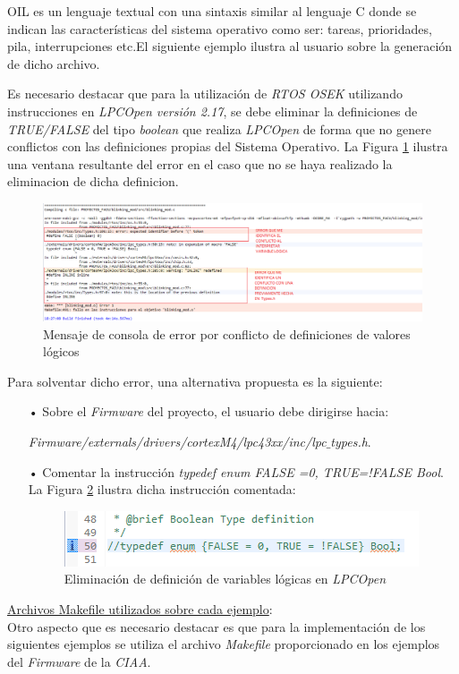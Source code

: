 \documentclass[12pt,letterpaper]{article}
\begin{document}
OIL es un lenguaje textual con una sintaxis similar al lenguaje C donde se indican las características del sistema operativo como ser: tareas, prioridades, pila, interrupciones etc.El siguiente ejemplo ilustra al usuario sobre la generación de dicho archivo.

Es necesario destacar que para la utilización de \textit{RTOS OSEK} utilizando instrucciones en \textit{LPCOpen versión 2.17}, se debe eliminar la definiciones de \textit{TRUE/FALSE} del tipo \textit{boolean} que realiza \textit{LPCOpen} de forma que no genere conflictos con las definiciones propias del Sistema Operativo\cite{direccionwebproblemaFALSE}. La Figura \ref{errorboolean} ilustra una ventana resultante del error en el caso que no se haya realizado la eliminacion de dicha definicion.

\begin{figure}[!h]
\centering
\includegraphics[width=18 cm]{figuras/f24.png}
\caption{Mensaje de consola de error por conflicto de definiciones de valores lógicos}
\label{errorboolean}
\end{figure}
Para solventar dicho error, una alternativa propuesta es la siguiente:
\begin{enumerate}
\item[•]Sobre el \textit{Firmware} del proyecto, el usuario debe dirigirse hacia:

\textit{Firmware/externals/drivers/cortexM4/lpc43xx/inc/lpc$\_$types.h}.
\item[•]Comentar la instrucción \textit{typedef enum {FALSE =0, TRUE=!FALSE} Bool}. La Figura \ref{eliminacion} ilustra dicha instrucción comentada:
\begin{figure}[!h]
\centering
\includegraphics[width=12 cm]{figuras/f25.png}
\caption{Eliminación de definición de variables lógicas en \textit{LPCOpen}}
\label{eliminacion}
\end{figure}
\end{enumerate}\underline{Archivos Makefile utilizados sobre cada ejemplo}: \\
Otro aspecto que es necesario destacar es que para la implementación de los siguientes ejemplos se utiliza el archivo \textit{Makefile} proporcionado en los ejemplos del \textit{Firmware} de la \textit{CIAA}.
\end{document}
